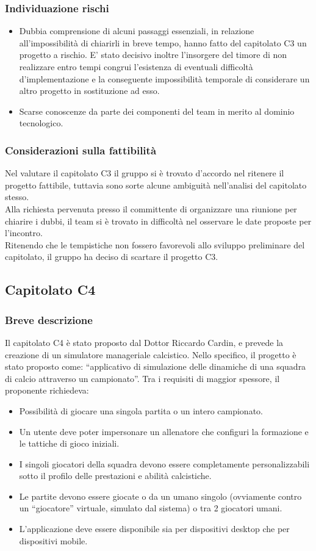 \subsubsection{Individuazione rischi}
\begin{itemize}
	\item Dubbia comprensione di alcuni passaggi essenziali, in relazione all'impossibilità di chiarirli in breve tempo, hanno fatto del capitolato C3 un progetto a rischio. 
E' stato decisivo inoltre l'insorgere del timore di non realizzare entro tempi congrui l'esistenza di eventuali difficoltà d'implementazione e la conseguente impossibilità temporale di considerare un altro progetto in sostituzione ad esso.
	\item Scarse conoscenze da parte dei componenti del team in merito al dominio tecnologico.
\end{itemize}

\subsubsection{Considerazioni sulla fattibilità}
Nel valutare il capitolato C3 il gruppo si è trovato d'accordo nel ritenere il progetto fattibile, tuttavia sono sorte alcune ambiguità nell'analisi del capitolato stesso.\\ Alla richiesta pervenuta presso il committente di organizzare una riunione per chiarire i dubbi, il team si è trovato in difficoltà nel osservare le date proposte per l'incontro. \\Ritenendo che le tempistiche non fossero favorevoli allo sviluppo preliminare del capitolato, il gruppo \team{} ha deciso di scartare il progetto C3.

\subsection{Capitolato C4}
\subsubsection{Breve descrizione}
Il capitolato C4 è stato proposto dal Dottor Riccardo Cardin, e prevede la creazione di un simulatore manageriale calcistico. Nello specifico, il progetto è stato proposto come: ``applicativo di simulazione delle dinamiche di una squadra di calcio attraverso un campionato''. Tra i requisiti di maggior spessore, il proponente richiedeva:
\begin{itemize}
	\item Possibilità di giocare una singola partita o un intero campionato.
	\item Un utente deve poter impersonare un allenatore che configuri la formazione e le tattiche di gioco iniziali.
	\item I singoli giocatori della squadra devono essere completamente personalizzabili sotto il profilo delle prestazioni e abilità calcistiche.
	\item Le partite devono essere giocate o da un umano singolo (ovviamente contro un ``giocatore'' virtuale, simulato dal sistema) o tra 2 giocatori umani.
	\item L'applicazione deve essere disponibile sia per dispositivi desktop che per dispositivi mobile.
\end{itemize}
